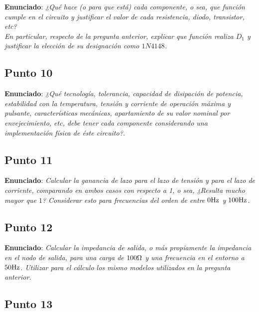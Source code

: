 \textbf{Enunciado}: \textsl{¿Qué hace (o para que está) cada componente, o sea, que función cumple en el circuito y justificar el valor de cada resistencia, diodo, transistor, etc?\\
En particular, respecto de la pregunta anterior, explicar que función realiza $D_{1}$ y justificar la elección de su designación como $1N4148$.}



\subsection{Punto 10}

\textbf{Enunciado}: \textsl{¿Qué tecnología, tolerancia, capacidad de disipación de potencia, estabilidad con la temperatura, tensión y corriente de operación máxima y pulsante, características mecánicas, apartamiento de su valor nominal por envejecimiento, etc, debe tener cada componente considerando una implementación física de éste circuito?.}



\subsection{Punto 11}

\textbf{Enunciado}: \textsl{Calcular la ganancia de lazo  para el lazo de tensión y para el lazo de corriente, comparando en ambos casos con respecto a 1, o sea, ¿Resulta  mucho mayor que $1$? Considerar esto para frecuencias del orden de entre $0 \si[per-mode=symbol]{\hertz}$ y $100 \si[per-mode=symbol]{\hertz}$.}



\subsection{Punto 12}

\textbf{Enunciado}: \textsl{Calcular la impedancia de salida, o más propiamente la impedancia en el nodo de salida, para una carga de $100 \si[per-mode=symbol]{\ohm}$ y una frecuencia en el entorno a $50 \si[per-mode=symbol]{\hertz}$. Utilizar para el cálculo los mismo modelos utilizados en la pregunta anterior.}



\subsection{Punto 13}

